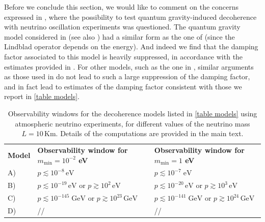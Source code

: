 \documentclass[11pt]{article}
\begin{document}
Before we conclude this section, we would like to comment on the concerns expressed in \cite{Adler:2000vfa}, where the possibility to test quantum gravity-induced decoherence with neutrino oscillation experiments was questioned. The quantum gravity model considered in \cite{Adler:2000vfa} (see also \cite{Lisi:2000zt}) had a similar form as the one of \cite{Petruzziello:2020wkd} (since the Lindblad operator depends on the energy). And indeed we find that the damping factor associated to this model is heavily suppressed, in accordance with the estimates provided in \cite{Adler:2000vfa}. For other models, such as the one in \cite{Breuer:2008rh}, similar arguments as those used in \cite{Adler:2000vfa} do not lead to such a large suppression of the damping factor, and in fact lead to estimates of the damping factor consistent with those we report in \cref{table models}.








\begin{table}
    \centering
{\tabulinesep=1.2mm
        \begin{tabu}{|l|l|l|}
       {\small\bf{Model}} & {\footnotesize \bf{Observability window for $m_{\text{min}}=10^{-2}$ eV}} &{\footnotesize \bf{Observability window for $m_{\text{min}}=1$ eV}} \\ 
       {\small  A)} & $p\lesssim 10^{-8}\,\text{eV}$ & $p\lesssim 10^{-7}\; \text{eV}$\\ 
           {\small  B)} &  $p\lesssim 10^{-19}\,\text{eV}$ or $p\gtrsim 10^{2}\,\text{eV}$  & $p\lesssim 10^{-20}\,\text{eV}$ or $p\gtrsim 10^{3}\,\text{eV}$\\ 
        {\small  C)} & $p\lesssim 10^{-145}\;\text{GeV}$ or $p\gtrsim 10^{23}\,\text{GeV}$ & $p\lesssim 10^{-141}\;\text{GeV}$ or $p\gtrsim 10^{24}\,\text{GeV}$\\ 
        {\small  D)} &  // & // \\  
        \end{tabu}}
    \caption{Observability windows for the decoherence models listed in \cref{table models} using atmospheric neutrino experiments, for different values of the neutrino mass $L=10\,\text{Km}$. Details of the computations are provided in the main text.}
    \label{windows_atmo_table}
\end{table}
\end{document}
